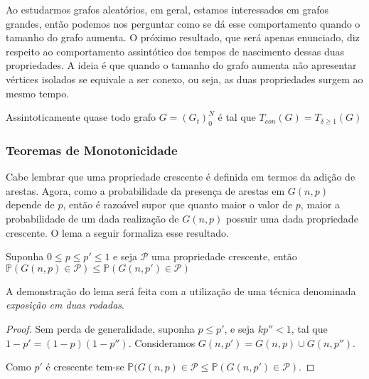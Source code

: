 Ao estudarmos grafos aleatórios, em geral, estamos interessados em grafos grandes, então podemos nos perguntar como se dá esse comportamento quando o tamanho do grafo aumenta. O próximo resultado, que será apenas enunciado, diz respeito ao comportamento assintótico dos tempos de nascimento dessas duas propriedades. A ideia é que quando o tamanho do grafo aumenta não apresentar vértices isolados se equivale a ser conexo, ou seja, as duas propriedades surgem ao mesmo tempo.

\begin{teorema}
Assintoticamente quase todo grafo $G = (G_t)_0^N$ é tal que $T_{con}(G) = T_{\delta \geq 1}(G)$
\end{teorema}{}


\subsubsection{Teoremas de Monotonicidade}

Cabe lembrar que uma propriedade crescente é definida em termos da adição de arestas. Agora, como a probabilidade da presença de arestas em $G(n, p)$ depende de $p$, então é razoável supor que quanto maior o valor de $p$, maior a probabilidade de um dada realização de $G(n, p)$ possuir uma dada propriedade crescente. O lema a seguir formaliza esse resultado.


\begin{lema}
Suponha $0 \leq p \leq p' \leq 1$ e seja $\mathcal{P}$ uma propriedade crescente, então $\mathbb{P}(G(n,p) \in \mathcal{P}) \leq \mathbb{P}(G(n,p') \in \mathcal{P})$
\end{lema}{}

A demonstração do lema será feita com a utilização de uma técnica denominada \emph{exposição em duas rodadas}.

\begin{proof}

Sem perda de generalidade, suponha $p \leq p'$, e seja $kp{''} < 1$, tal que $1-p' = (1-p)(1 - p{''})$. Consideramos $G(n, p') = G(n, p) \cup G(n, p{''})$.

Como $p'$ é crescente tem-se $\mathbb{P}(G(n,p) \in \mathcal{P} \leq \mathbb{P}(G(n,p') \in \mathcal{P})$.
\end{proof}{}

